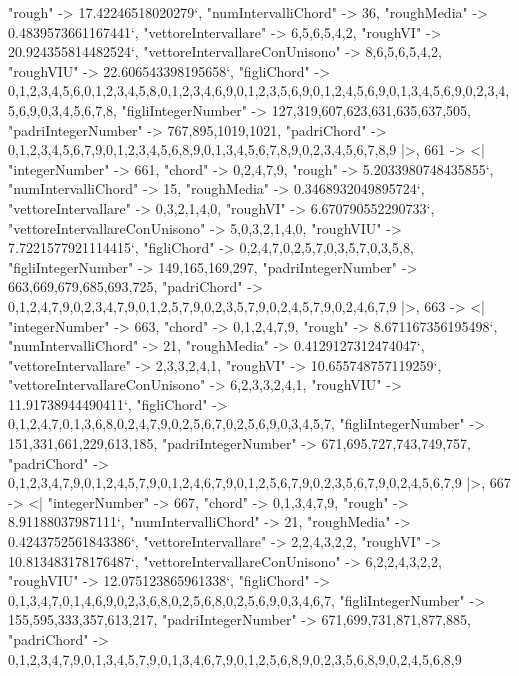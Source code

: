 \documentclass[
]{article}
\begin{document}
\begin{DatasetVerbatim}
    "rough" -> 17.42246518020279`,
    "numIntervalliChord" -> 36,
    "roughMedia" -> 0.4839573661167441`,
    "vettoreIntervallare" -> {6,5,6,5,4,2},
    "roughVI" -> 20.924355814482524`,
    "vettoreIntervallareConUnisono" -> {8,6,5,6,5,4,2},
    "roughVIU" -> 22.606543398195658`,
    "figliChord" -> {{0,1,2,3,4,5,6},{0,1,2,3,4,5,8},{0,1,2,3,4,6,9},{0,1,2,3,5,6,9},{0,1,2,4,5,6,9},{0,1,3,4,5,6,9},{0,2,3,4,5,6,9},{0,3,4,5,6,7,8}},
    "figliIntegerNumber" -> {127,319,607,623,631,635,637,505},
    "padriIntegerNumber" -> {767,895,1019,1021},
    "padriChord" -> {{0,1,2,3,4,5,6,7,9},{0,1,2,3,4,5,6,8,9},{0,1,3,4,5,6,7,8,9},{0,2,3,4,5,6,7,8,9}}
  |>,
  661 -> <|
    "integerNumber" -> 661,
    "chord" -> {0,2,4,7,9},
    "rough" -> 5.2033980748435855`,
    "numIntervalliChord" -> 15,
    "roughMedia" -> 0.3468932049895724`,
    "vettoreIntervallare" -> {0,3,2,1,4,0},
    "roughVI" -> 6.670790552290733`,
    "vettoreIntervallareConUnisono" -> {5,0,3,2,1,4,0},
    "roughVIU" -> 7.7221577921114415`,
    "figliChord" -> {{0,2,4,7},{0,2,5,7},{0,3,5,7},{0,3,5,8}},
    "figliIntegerNumber" -> {149,165,169,297},
    "padriIntegerNumber" -> {663,669,679,685,693,725},
    "padriChord" -> {{0,1,2,4,7,9},{0,2,3,4,7,9},{0,1,2,5,7,9},{0,2,3,5,7,9},{0,2,4,5,7,9},{0,2,4,6,7,9}}
  |>,
  663 -> <|
    "integerNumber" -> 663,
    "chord" -> {0,1,2,4,7,9},
    "rough" -> 8.671167356195498`,
    "numIntervalliChord" -> 21,
    "roughMedia" -> 0.4129127312474047`,
    "vettoreIntervallare" -> {2,3,3,2,4,1},
    "roughVI" -> 10.655748757119259`,
    "vettoreIntervallareConUnisono" -> {6,2,3,3,2,4,1},
    "roughVIU" -> 11.91738944490411`,
    "figliChord" -> {{0,1,2,4,7},{0,1,3,6,8},{0,2,4,7,9},{0,2,5,6,7},{0,2,5,6,9},{0,3,4,5,7}},
    "figliIntegerNumber" -> {151,331,661,229,613,185},
    "padriIntegerNumber" -> {671,695,727,743,749,757},
    "padriChord" -> {{0,1,2,3,4,7,9},{0,1,2,4,5,7,9},{0,1,2,4,6,7,9},{0,1,2,5,6,7,9},{0,2,3,5,6,7,9},{0,2,4,5,6,7,9}}
  |>,
  667 -> <|
    "integerNumber" -> 667,
    "chord" -> {0,1,3,4,7,9},
    "rough" -> 8.91188037987111`,
    "numIntervalliChord" -> 21,
    "roughMedia" -> 0.4243752561843386`,
    "vettoreIntervallare" -> {2,2,4,3,2,2},
    "roughVI" -> 10.813483178176487`,
    "vettoreIntervallareConUnisono" -> {6,2,2,4,3,2,2},
    "roughVIU" -> 12.075123865961338`,
    "figliChord" -> {{0,1,3,4,7},{0,1,4,6,9},{0,2,3,6,8},{0,2,5,6,8},{0,2,5,6,9},{0,3,4,6,7}},
    "figliIntegerNumber" -> {155,595,333,357,613,217},
    "padriIntegerNumber" -> {671,699,731,871,877,885},
    "padriChord" -> {{0,1,2,3,4,7,9},{0,1,3,4,5,7,9},{0,1,3,4,6,7,9},{0,1,2,5,6,8,9},{0,2,3,5,6,8,9},{0,2,4,5,6,8,9}}

\end{DatasetVerbatim}
\end{document}
